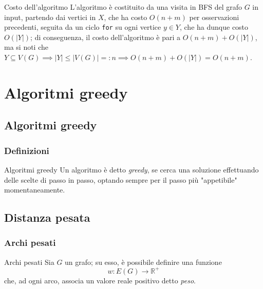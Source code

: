 \documentclass[a4paper, 12pt]{report}
\begin{document}
    \begin{framedobs}{Costo dell'algoritmo}
        L'algoritmo è costituito da una visita in BFS del grafo $G$ in input, partendo dai vertici in $X$, che ha costo $O(n + m)$ per osservazioni precedenti, seguita da un ciclo \texttt{for} su ogni vertice $y \in Y$, che ha dunque costo $O(|Y|)$; di conseguenza, il costo dell'algoritmo è pari a $O(n + m) + O(|Y|)$, ma si noti che $Y \subseteq V(G) \implies |Y| \le |V(G)| =: n \implies O(n + m) + O(|Y|) = O(n + m)$.
    \end{framedobs}

    \chapter{Algoritmi greedy}

    \section{Algoritmi greedy}

    \subsection{Definizioni}

    \begin{frameddefn}{Algoritmi greedy}
        Un algoritmo è detto \textit{greedy}, se cerca una soluzione effettuando delle scelte di passo in passo, optando sempre per il passo più "appetibile" momentaneamente.
    \end{frameddefn}

    \section{Distanza pesata}

    \subsection{Archi pesati}

    \begin{frameddefn}{Archi pesati}
        Sia $G$ un grafo; su esso, è possibile definire una funzione $$w: E(G) \rightarrow \mathbb{R}^+$$ che, ad ogni arco, associa un valore reale positivo detto \textit{peso}.
    \end{frameddefn}
\end{document}
